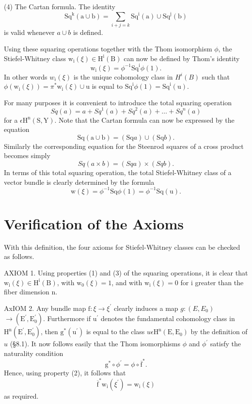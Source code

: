 \documentclass[10pt]{article}
\begin{document}
(4) The Cartan formula. The identity
$$
\mathrm{Sq}^{\mathrm{k}}(\mathrm{a} \cup \mathrm{b})=\sum_{i+j=k} \mathrm{Sq}^{\mathrm{i}}(\mathrm{a}) \cup \mathrm{Sq}^{\mathrm{j}}(\mathrm{b})
$$
is valid whenever $a \cup b$ is defined.

Using these squaring operations together with the Thom isomorphism $\phi$, the Stiefel-Whitney class $\mathrm{w}_{\mathrm{i}}(\xi) \in \mathrm{H}^{\mathrm{i}}(\mathrm{B})$ can now be defined by Thom's identity
$$
\mathrm{w}_{\mathrm{i}}(\xi)=\phi^{-1} \mathrm{Sq}^{\mathrm{i}} \phi(1) .
$$
In other words $w_{i}(\xi)$ is the unique cohomology class in $H^{i}(B)$ such that $\phi\left(\mathrm{w}_{\mathrm{i}}(\xi)\right)=\pi^{*} \mathrm{w}_{\mathrm{i}}(\xi) \cup \mathrm{u}$ is equal to $\mathrm{Sq}^{\mathrm{i}} \phi(1)=\mathrm{Sq}^{\mathrm{i}}(\mathrm{u})$.

For many purposes it is convenient to introduce the total squaring operation
$$
S q(a)=a+S q^{1}(a)+S q^{2}(a)+\ldots+S q^{n}(a)
$$
for a $\epsilon \mathrm{H}^{\mathrm{n}}(\mathrm{S}, \mathrm{Y})$. Note that the Cartan formula can now be expressed by the equation
$$
\mathrm{Sq}(\mathrm{a} \cup \mathrm{b})=(\mathrm{Sq} a) \cup(\mathrm{Sq} b) .
$$
Similarly the corresponding equation for the Steenrod squares of a cross product becomes simply
$$
S q(a \times b)=(S q a) \times(S q b) .
$$
In terms of this total squaring operation, the total Stiefel-Whitney class of a vector bundle is clearly determined by the formula
$$
\mathrm{w}(\xi)=\phi^{-1} \mathrm{Sq} \phi(1)=\phi^{-1} \mathrm{Sq}(\mathrm{u}) .
$$

\section{Verification of the Axioms}
With this definition, the four axioms for Stiefel-Whitney classes can be checked as follows.

AXIOM 1. Using properties (1) and (3) of the squaring operations, it is clear that $\mathrm{w}_{\mathrm{i}}(\xi) \in \mathrm{H}^{\mathrm{i}}(\mathrm{B})$, with $\mathrm{w}_{0}(\xi)=1$, and with $\mathrm{w}_{\mathrm{i}}(\xi)=0$ for $\mathrm{i}$ greater than the fiber dimension $\mathrm{n}$.

AxIOM 2. Any bundle map $\mathrm{f}: \xi \rightarrow \xi^{\prime}$ clearly induces a map $g:\left(E, E_{0}\right)$ $\rightarrow\left(\mathrm{E}^{\prime}, \mathrm{E}_{0}^{\prime}\right)$. Furthermore if $\mathrm{u}^{\prime}$ denotes the fundamental cohomology class in $\mathrm{H}^{\mathrm{n}}\left(\mathrm{E}^{\prime}, \mathrm{E}_{0}^{\prime}\right)$, then $\mathrm{g}^{*}\left(\mathrm{u}^{\prime}\right)$ is equal to the class $u \epsilon \mathrm{H}^{\mathrm{n}}\left(\mathrm{E}, \mathrm{E}_{0}\right)$ by the definition of $u$ (§8.1). It now follows easily that the Thom isomorphisms $\phi$ and $\phi^{\prime}$ satisfy the naturality condition
$$
\mathrm{g}^{*} \circ \phi^{\prime}=\phi \circ \overline{\mathrm{f}}^{*} .
$$
Hence, using property (2), it follows that
$$
\overline{\mathrm{f}}^{*} \mathrm{w}_{\mathrm{i}}\left(\xi^{\prime}\right)=\mathrm{w}_{\mathrm{i}}(\xi)
$$
as required.
\end{document}
